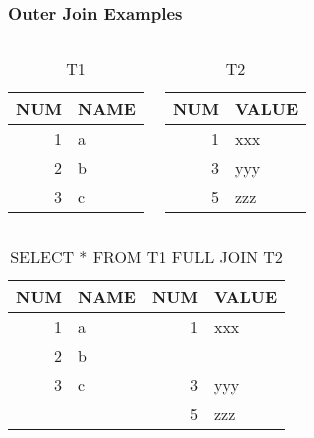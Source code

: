 \documentclass[dvipsnames]{beamer}
\theoremstyle{plain}
\begin{document}
\begin{frame}[fragile]
  \frametitle{Outer Join Examples}

  \begin{example}
    \begin{columns}[t]
      \begin{tiny}
      \begin{table}
        \caption{T1}
        \begin{tabular}{|r|l|}\hline
NUM & NAME \\\hline\hline
  1 & a    \\\hline
  2 & b    \\\hline
  3 & c    \\\hline
        \end{tabular}
      \end{table}
      \end{tiny}

      \begin{tiny}
      \begin{table}
        \caption{T2}
        \begin{tabular}{|r|l|}\hline
NUM & VALUE \\\hline\hline
  1 & xxx   \\\hline
  3 & yyy   \\\hline
  5 & zzz   \\\hline
        \end{tabular}
      \end{table}
      \end{tiny}
    \end{columns}

    \pause
    \begin{center}
      \begin{tiny}
      \begin{table}
        \caption{SELECT * FROM T1 FULL JOIN T2}
        \begin{tabular}{|r|l|r|l|}\hline
NUM & NAME & NUM & VALUE \\\hline\hline
  1 & a    &   1 & xxx   \\\hline
  2 & b    &     &       \\\hline
  3 & c    &   3 & yyy   \\\hline
    &      &   5 & zzz   \\\hline
        \end{tabular}
      \end{table}
      \end{tiny}
    \end{center}
  \end{example}
\end{frame}
\end{document}
